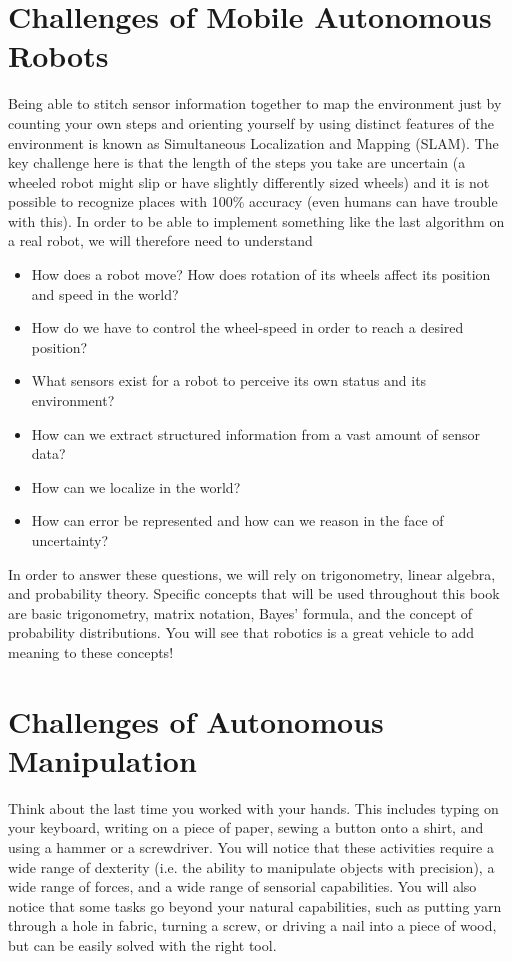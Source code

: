 \section{Challenges of Mobile Autonomous Robots}

Being able to stitch sensor information together to map the environment just by counting your own steps and orienting yourself by using distinct features of the environment is known as Simultaneous Localization and Mapping (SLAM). The key challenge here is that the length of the steps you take are uncertain (a wheeled robot might slip or have slightly differently sized wheels) and it is not possible to recognize places with 100\% accuracy (even humans can have trouble with this). In order to be able to implement something like the last algorithm on a real robot, we will therefore need to understand

\begin{itemize}
\item How does a robot move? How does rotation of its wheels affect its position and speed in the world?
\item How do we have to control the wheel-speed in order to reach a desired position?
\item What sensors exist for a robot to perceive its own status and its environment?
\item How can we extract structured information from a vast amount of sensor data?
\item How can we localize in the world?
\item How can error be represented and how can we reason in the face of uncertainty?
\end{itemize}

In order to answer these questions, we will rely on trigonometry, linear algebra, and probability theory. Specific concepts that will be used throughout this book are basic trigonometry, matrix notation, Bayes' formula, and the concept of probability distributions. You will see that robotics is a great vehicle to add meaning to these concepts!


\section{Challenges of Autonomous Manipulation}
Think about the last time you worked with your hands. This includes typing on your keyboard, writing on a piece of paper, sewing a button onto a shirt, and using a hammer or a screwdriver. You will notice that these activities require a wide range of dexterity (i.e. the ability to manipulate objects with precision), a wide range of forces, and a wide range of sensorial capabilities. You will also notice that some tasks go beyond your natural capabilities, such as putting yarn through a hole in fabric, turning a screw, or driving a nail into a piece of wood, but can be easily solved with the right tool.

